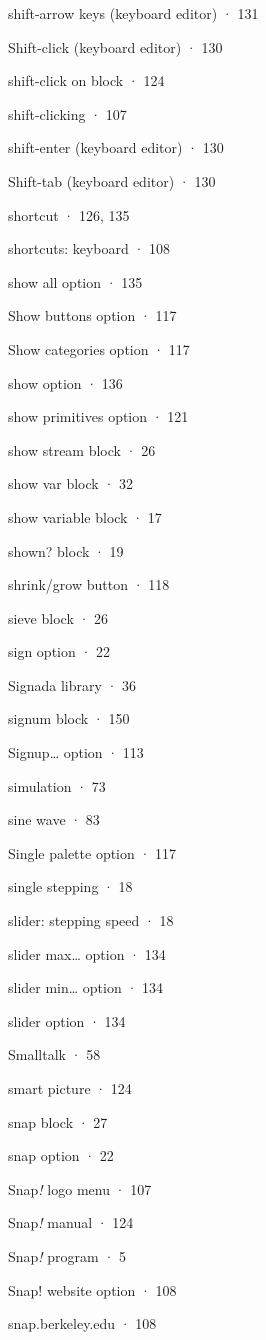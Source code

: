 shift-arrow keys (keyboard editor) · 131

Shift-click (keyboard editor) · 130

shift-click on block · 124

shift-clicking · 107

shift-enter (keyboard editor) · 130

Shift-tab (keyboard editor) · 130

shortcut · 126, 135

shortcuts: keyboard · 108

show all option · 135

Show buttons option · 117

Show categories option · 117

show option · 136

show primitives option · 121

show stream block · 26

show var block · 32

show variable block · 17

shown? block · 19

shrink/grow button · 118

sieve block · 26

sign option · 22

Signada library · 36

signum block · 150

Signup\ldots{} option · 113

simulation · 73

sine wave · 83

Single palette option · 117

single stepping · 18

slider: stepping speed · 18

slider max\ldots{} option · 134

slider min\ldots{} option · 134

slider option · 134

Smalltalk · 58

smart picture · 124

snap block · 27

snap option · 22

Snap\emph{!} logo menu · 107

Snap\emph{!} manual · 124

Snap\emph{!} program · 5

Snap! website option · 108

snap.berkeley.edu · 108

